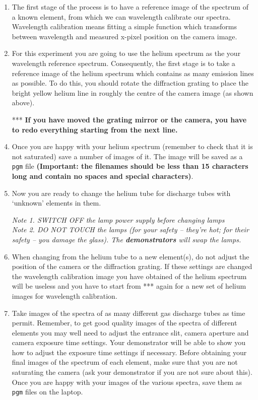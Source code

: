 \documentclass[12pt]{article}
\begin{document}
\begin{enumerate}

\item The first stage of the process is to have a reference image of the spectrum of a known element, from which we can wavelength calibrate our spectra. Wavelength calibration means fitting a simple function which transforms between wavelength and measured x-pixel position on the camera image.

\item For this experiment you are going to use the helium spectrum as the your wavelength reference spectrum. Consequently, the first stage is to take a reference image of the helium spectrum which contains as many emission lines as possible. To do this, you should rotate the diffraction grating to place the bright yellow helium line in roughly the centre of the camera image (as shown above).

\item[***] {\bf If you have moved the grating mirror or the camera, you have to redo everything starting from the next line.}

\item Once you are happy with your helium spectrum (remember to check that it is not saturated) save a number of images of it. The image will be saved as a {\tt pgm} file {\bf(Important: the filenames should be less than 15 characters long and contain no spaces and special characters)}.

\item Now you are ready to change the helium tube for discharge tubes with `unknown' elements in them.

{\sl Note 1. SWITCH OFF the lamp power supply before changing lamps}\\
{\sl Note 2. DO NOT TOUCH the lamps (for your safety -- they're hot; for their safety -- you damage the glass). The {\bf demonstrators} will swap the lamps.}

\item When changing from the helium tube to a new element(s), {\sc do not adjust the position of the camera or the diffraction grating}. If these settings are changed the wavelength calibration image you have obtained of the helium spectrum will be useless and you have to start from *** again for a new set of helium images for wavelength calibration.

\item Take images of the spectra of as many different gas discharge tubes as time permit. Remember, to get good quality images of the spectra of different elements you may well need to adjust the entrance slit, camera aperture and camera exposure time settings. Your demonstrator will be able to show you how to adjust the exposure time settings if necessary. Before obtaining your final images of the spectrum of each element, make sure that you are not saturating the camera (ask your demonstrator if you are not sure about this). Once you are happy with your images of the various spectra, save them as {\tt pgm} files on the laptop.

\end{enumerate}
\end{document}
